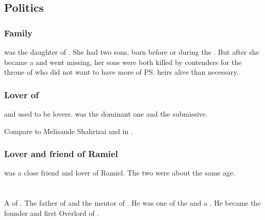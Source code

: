 \subsection{Politics}





\subsubsection{Family}
\Shiaraid{} was the daughter of . 
She had two sons, born before or during the \secondbanewar. 
But after she became a \malach{} and went missing, her sons were both killed by contenders for the throne of \Mystraacht{} who did not want to have more of \ps{\Zachirah} heirs alive than necessary. 





\subsubsection{Lover of \Aryal}
\Shiaraid{} and \Aryal{} used to be lovers. 
\Shiaraid{} was the dominant one and \Aryal{} the submissive. 

Compare to Melisande Shahrizai and \Phedre{} in . 





\subsubsection{Lover and friend of Ramiel}
\Shiaraid{} was a close friend and lover of Ramiel. 
The two were about the same age. 















\section{\Zachirah}
\index{\Zachirah}
A \resphan{} of .
The father of  and the mentor of . 
He was one of the  and a . 
He became the founder and first Overlord of . 








